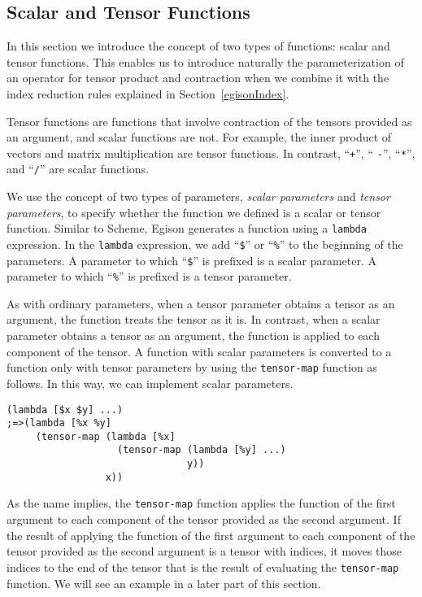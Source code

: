 \documentclass[acmlarge]{acmart}
\begin{document}
\subsection{Scalar and Tensor Functions}\label{sfTf}

In this section we introduce the concept of two types of functions: scalar and tensor functions.
This enables us to introduce naturally the parameterization of an operator for tensor product and contraction when we combine it with the index reduction rules explained in Section~\ref{egisonIndex}.

Tensor functions are functions that involve contraction of the tensors provided as an argument, and scalar functions are not.
For example, the inner product of vectors and matrix multiplication are tensor functions.
In contrast, ``\texttt{+}'', `` \texttt{-}'', ``\texttt{*}'', and ``\texttt{/}'' are scalar functions.

We use the concept of two types of parameters, \textit{scalar parameters} and \textit{tensor parameters}, to specify whether the function we defined is a scalar or tensor function.
Similar to Scheme, Egison generates a function using a \texttt{lambda} expression.
In the \texttt{lambda} expression, we add ``\texttt{\$}'' or ``\texttt{\%}'' to the beginning of the parameters.
A parameter to which ``\texttt{\$}'' is prefixed is a scalar parameter.
A parameter to which ``\texttt{\%}'' is prefixed is a tensor parameter.

As with ordinary parameters, when a tensor parameter obtains a tensor as an argument, the function treats the tensor as it is.
In contrast, when a scalar parameter obtains a tensor as an argument, the function is applied to each component of the tensor.
A function with scalar parameters is converted to a function only with tensor parameters by using the \texttt{tensor-map} function as follows.
In this way, we can implement scalar parameters.

{\footnotesize
\begin{verbatim}
(lambda [$x $y] ...)
;=>(lambda [%x %y]
     (tensor-map (lambda [%x]
                   (tensor-map (lambda [%y] ...)
                               y))
                 x))
\end{verbatim}
}

As the name implies, the \texttt{tensor-map} function applies the function of the first argument to each component of the tensor provided as the second argument.
If the result of applying the function of the first argument to each component of the tensor provided as the second argument is a tensor with indices, it moves those indices to the end of the tensor that is the result of evaluating the \texttt{tensor-map} function.
We will see an example in a later part of this section.
\end{document}
